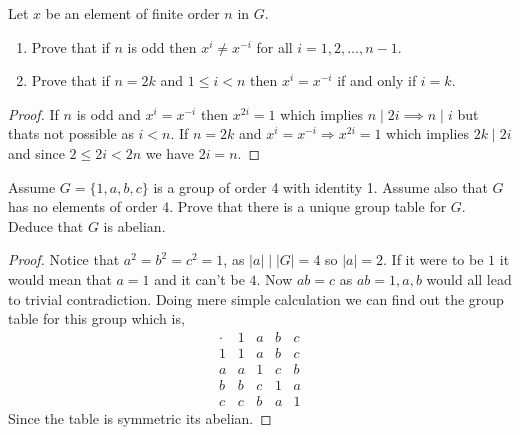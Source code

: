 \begin{problem}
    Let $x$ be an element of finite order $n$ in $G$.
    \begin{enumerate}
        \item Prove that if $n$ is odd then $x^i \neq x^{-i}$ for all $i = 1, 2, \dots, n-1$.
        \item Prove that if $n = 2k$ and $1 \le i < n$ then $x^i = x^{-i}$ if and only if $i = k$.
    \end{enumerate}
\end{problem}

\begin{proof}
    If $n$ is odd and $x^{i} = x^{-i}$ then $x^{2i}=1$ which implies $n \mid 2i \implies n \mid i$
    but thats not possible as $i < n$. If $n=2k$ and $x^{i}=x^{-i} \Rightarrow x^{2i}=1$ which implies $2k \mid 2i$ and
    since $2 \le 2i < 2n$ we have $2i=n$.
\end{proof}

\begin{problem}
    Assume $G = \{1, a, b, c\}$ is a group of order 4 with identity 1. Assume also that $G$ has no elements of order 4.
    Prove that there is a unique group table for $G$. Deduce that $G$ is abelian.
\end{problem}

\begin{proof}
    Notice that $a^2=b^2=c^2=1$, as $|a| \mid |G|=4$ so $|a|=2$. If it were to be $1$ it would mean that $a=1$ and it can't be $4$.
    Now $ab=c$ as $ab=1,a,b$ would all lead to trivial contradiction. Doing mere simple calculation we can find out the group table
    for this group which is,
        \[
    \begin{array}{c|cccc}
    \cdot & 1 & a & b & c \\ \hline
    1 & 1 & a & b & c \\
    a & a & 1 & c & b \\
    b & b & c & 1 & a \\
    c & c & b & a & 1
    \end{array}
\]
Since the table is symmetric its abelian.
\end{proof}